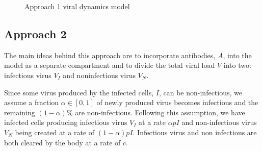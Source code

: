 \documentclass[]{elsarticle}
\theoremstyle{definition}
\begin{document}
\begin{figure}[H]
	\begin{center}
	\end{center}
	\caption{Approach 1 viral dynamics model}
\end{figure}


\subsection{Approach 2}

The main ideas behind this approach are to incorporate antibodies, $A$, into the model as a separate compartment and to divide the total viral load $V$ into two: infectious virus $V_I$ and noninfectious virus $V_N$.

Since some virus produced by the infected cells, $I$, can be non-infectious, we assume a fraction $\alpha \in [0,1]$ of newly produced virus becomes infectious and the remaining $(1-\alpha)\%$ are non-infectious. Following this assumption, we have infected cells producing infectious virus $V_I$ at a rate $\alpha p I$ and non-infectious virus $V_N$ being created at a rate of  $(1 - \alpha) p I$. Infectious virus and non infectious are both cleared by the body at a rate of $c$.
\end{document}

